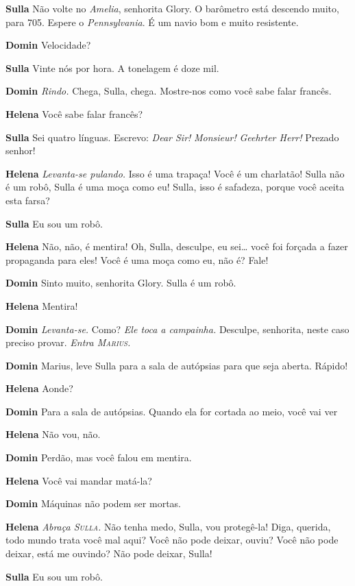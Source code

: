 \textbf{Sulla} Não volte no \textit{Amelia}, senhorita Glory. O barômetro está descendo muito,
para 705. Espere o \textit{Pennsylvania}. É um navio bom e muito resistente.

\textbf{Domin} Velocidade?

\textbf{Sulla} Vinte nós por hora. A tonelagem é doze mil.

\textbf{Domin} \emph{Rindo.} Chega, Sulla, chega. Mostre-nos como você sabe falar
francês.

\textbf{Helena} Você sabe falar francês?

\textbf{Sulla} Sei quatro línguas. Escrevo: \textit{Dear Sir!} \textit{Monsieur!}
\textit{Geehrter Herr!} Prezado senhor!

\textbf{Helena} \emph{Levanta-se pulando.} Isso é uma trapaça! Você é um charlatão!
Sulla não é um robô, Sulla é uma moça como eu! Sulla, isso é safadeza, porque
você aceita esta farsa?

\textbf{Sulla} Eu sou um robô.

\textbf{Helena} Não, não, é mentira! Oh, Sulla, desculpe, eu sei\ldots{} você foi forçada a
fazer propaganda para eles! Você é uma moça como eu, não é? Fale!

\textbf{Domin} Sinto muito, senhorita Glory. Sulla é um robô.

\textbf{Helena} Mentira!

\textbf{Domin} \emph{Levanta-se.} Como? \emph{Ele toca a campainha.} Desculpe,
senhorita, neste caso preciso provar.
\emph{Entra \textsc{Marius}.}

\textbf{Domin} Marius, leve Sulla para a sala de autópsias para que seja aberta.
Rápido!

\textbf{Helena} Aonde?

\textbf{Domin} Para a sala de autópsias. Quando ela for cortada ao meio, você vai ver 

\textbf{Helena} Não vou, não.

\textbf{Domin} Perdão, mas você falou em mentira.

\textbf{Helena} Você vai mandar matá-la?

\textbf{Domin} Máquinas não podem ser mortas.

\textbf{Helena} \emph{Abraça \textsc{Sulla}.} Não tenha medo, Sulla, vou protegê-la! Diga,
querida, todo mundo trata você mal aqui? Você não pode deixar, ouviu? Você não
pode deixar, está me ouvindo? Não pode deixar, Sulla!

\textbf{Sulla} Eu sou um robô.

